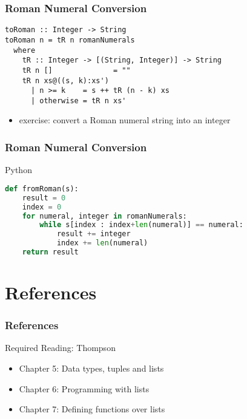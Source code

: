 \documentclass[dvipsnames]{beamer}
\theoremstyle{plain}
\begin{document}
\begin{frame}[fragile]
  \frametitle{Roman Numeral Conversion}

  \begin{exampleblock}{}
    \begin{lstlisting}
toRoman :: Integer -> String
toRoman n = tR n romanNumerals
  where
    tR :: Integer -> [(String, Integer)] -> String
    tR n []              = ""
    tR n xs@((s, k):xs')
      | n >= k    = s ++ tR (n - k) xs
      | otherwise = tR n xs'
    \end{lstlisting}
  \end{exampleblock}

  \pause
  \begin{itemize}
    \item exercise: convert a Roman numeral string into an integer
  \end{itemize}
\end{frame}

\begin{frame}[fragile]
  \frametitle{Roman Numeral Conversion}

  \begin{exampleblock}{Python}
    \begin{lstlisting}[language=Python]
def fromRoman(s):
    result = 0
    index = 0
    for numeral, integer in romanNumerals:
        while s[index : index+len(numeral)] == numeral:
            result += integer
            index += len(numeral)
    return result
    \end{lstlisting}
  \end{exampleblock}
\end{frame}

\section*{References}

\begin{frame}
  \frametitle{References}

  \begin{block}{Required Reading: Thompson}
    \begin{itemize}
      \item Chapter 5: \alert{Data types, tuples and lists}
      \item Chapter 6: \alert{Programming with lists}
      \item Chapter 7: \alert{Defining functions over lists}
    \end{itemize}
  \end{block}
\end{frame}
\end{document}
